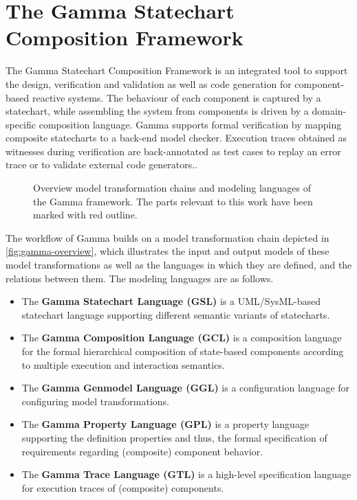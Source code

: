 \section{The Gamma Statechart Composition Framework}\label{sec:gamma}

The Gamma Statechart Composition Framework is an integrated
tool to support the design, verification and validation as well as
code generation for component-based reactive systems. The behaviour of each component is captured by a statechart, while assembling the system from components is driven by a domain-specific composition language. Gamma supports formal verification by mapping composite statecharts to a back-end model checker. Execution traces obtained as witnesses during verification are back-annotated as test cases to replay an error trace or to validate external code generators.\cite{molnar2018gamma}. 

\begin{figure}[!ht]
	\centering
	
	\caption{Overview model transformation chains and modeling languages of the Gamma framework. The parts relevant to this work have been marked with red outline.}
	\label{fig:gamma-overview}
\end{figure}

The workflow of Gamma builds on a model transformation chain depicted in \autoref{fig:gamma-overview}, which illustrates the input and output models of these model transformations as well as the languages in which they are defined, and the relations between them. The modeling languages are as follows.


\begin{itemize}
	\item The \textbf{Gamma Statechart Language (GSL)} is a UML/SysML-based statechart language supporting different semantic variants of statecharts.
	\item The \textbf{Gamma Composition Language (GCL)} is a composition language for the formal hierarchical composition of state-based 	components according to multiple execution and interaction semantics.
	\item The \textbf{Gamma Genmodel Language (GGL)} is a configuration language for configuring model transformations.
	\item The \textbf{Gamma Property Language (GPL)} is a property language supporting the definition properties and thus, the formal specification of requirements regarding (composite)	component behavior.
	\item The \textbf{Gamma Trace Language (GTL)} is a high-level specification language for  execution traces of (composite) components.
\end{itemize}

